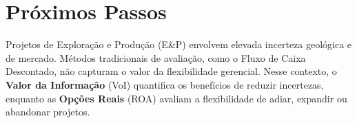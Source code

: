 
\chapter{Próximos Passos}

Projetos de Exploração e Produção (E\&P) envolvem elevada incerteza geológica e de mercado. Métodos tradicionais de avaliação, como o Fluxo de Caixa Descontado, não capturam o valor da flexibilidade gerencial. Nesse contexto, o \textbf{Valor da Informação} (VoI) quantifica os benefícios de reduzir incertezas, enquanto as \textbf{Opções Reais} (ROA) avaliam a flexibilidade de adiar, expandir ou abandonar projetos.



